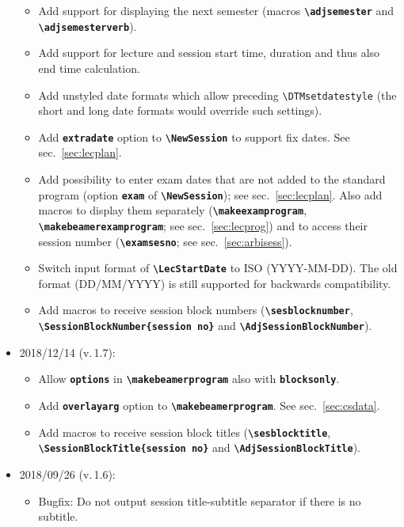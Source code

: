 \documentclass[english]{article}
\newcommand*\jmacro[1]{\textbf{\texttt{#1}}}
\newcommand*\jcsmacro[1]{\jmacro{\textbackslash{#1}}}
\newcommand*\joption[1]{\textbf{\texttt{#1}}}
\newcommand*\jfmacro[1]{\texttt{#1}}
\newcommand*\jfcsmacro[1]{\jfmacro{\textbackslash{#1}}}
\newcommand*\jparam[1]{\angus #1\angud}
\begin{document}
\begin{itemize}
	\begin{itemize}
		\item Add support for displaying the next semester (macros \jcsmacro{adjsemester} and
		      \jcsmacro{adjsemesterverb}).
		\item Add support for lecture and session start time, duration and thus also end time
		      calculation.
		\item Add unstyled date formats which allow preceding \jfcsmacro{DTMsetdatestyle}
		      (the short and long date formats would override such settings).
		\item Add \joption{extradate} option to \jcsmacro{NewSession} to support fix dates.
		      See sec.~\ref{sec:lecplan}.
		\item Add possibility to enter exam dates that are not added to the standard program
		      (option \joption{exam} of \jcsmacro{NewSession}); see sec.~\ref{sec:lecplan}.
		      Also add macros to display them separately (\jcsmacro{makeexamprogram},
		      \jcsmacro{makebeamerexamprogram}; see sec.~\ref{sec:lecprog}) and to
		      access their session number (\jcsmacro{examsesno}; see sec.~\ref{sec:arbisess}).
		\item Switch input format of \jcsmacro{LecStartDate} to ISO (YYYY-MM-DD). The old format
		      (DD/MM/YYYY) is still supported for backwards compatibility.
		\item Add macros to receive session block numbers (\jcsmacro{sesblocknumber},\\
		      \jcsmacro{SessionBlockNumber\{\jparam{session no}\}} and \jcsmacro{AdjSessionBlockNumber}).
	\end{itemize}
\item 2018/12/14 (v.\,1.7):
	\begin{itemize}
		\item Allow \joption{options} in \jcsmacro{makebeamerprogram} also with \joption{blocksonly}.
		\item Add \joption{overlayarg} option to \jcsmacro{makebeamerprogram}. See sec.~\ref{sec:csdata}.
		\item Add macros to receive session block titles (\jcsmacro{sesblocktitle},\\
		      \jcsmacro{SessionBlockTitle\{\jparam{session no}\}} and \jcsmacro{AdjSessionBlockTitle}).
	\end{itemize}
\item 2018/09/26 (v.\,1.6):
	\begin{itemize}
	    \item Bugfix: Do not output session title-subtitle separator if there is no	subtitle.

\end{itemize}
\end{itemize}
\end{document}
